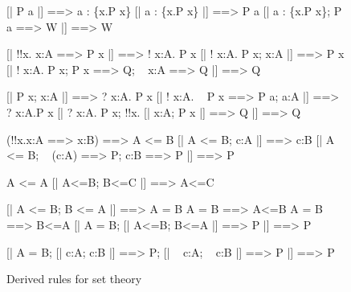 \begin{figure} \underscoreon
\begin{ttbox}
        [| P a |] ==> a : \{x.P x\}
        [| a : \{x.P x\} |] ==> P a
        [| a : \{x.P x\};  P a ==> W |] ==> W

           [| !!x. x:A ==> P x |] ==> ! x:A. P x
           [| ! x:A. P x;  x:A |] ==> P x
           [| ! x:A. P x;  P x ==> Q;  ~ x:A ==> Q |] ==> Q

            [| P x;  x:A |] ==> ? x:A. P x
           [| ! x:A. ~ P x ==> P a;  a:A |] ==> ? x:A.P x
            [| ? x:A. P x;  !!x. [| x:A; P x |] ==> Q  |] ==> Q

         (!!x.x:A ==> x:B) ==> A <= B
         [| A <= B;  c:A |] ==> c:B
        [| A <= B;  ~ (c:A) ==> P;  c:B ==> P |] ==> P

     A <= A
    [| A<=B;  B<=C |] ==> A<=C

       [| A <= B;  B <= A |] ==> A = B
      A = B ==> A<=B
      A = B ==> B<=A
       [| A = B;  [| A<=B; B<=A |] ==> P |]  ==>  P

      [| A = B;  [| c:A; c:B |] ==> P;  
                           [| ~ c:A; ~ c:B |] ==> P 
                |]  ==>  P
\end{ttbox}
\caption{Derived rules for set theory} \label{hol-set1}
\end{figure}


